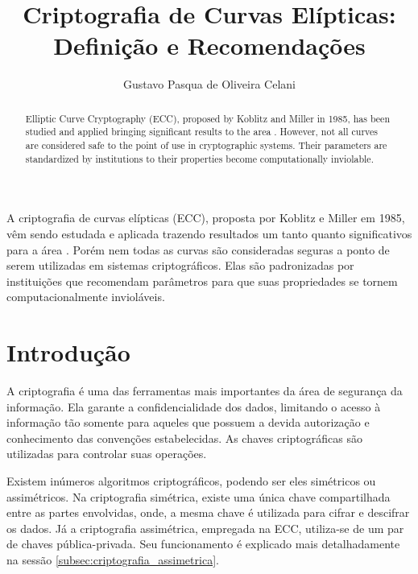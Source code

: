 \documentclass[12pt]{article}
\begin{document}
    \title{
        Criptografia de Curvas Elípticas: Definição e Recomendações
    }
    
    \author{Gustavo Pasqua de Oliveira Celani}

    \address{
        Universidade Estadual de Campinas (UNICAMP)\\Campinas - SP, Brasil\\2019
    }

    \maketitle

    \begin{abstract}
        Elliptic Curve Cryptography (ECC), proposed by Koblitz and Miller in 1985, has been studied and applied bringing significant results to the area \cite{vanstone2000state}. However, not all curves are considered safe to the point of use in cryptographic systems. Their parameters are standardized by institutions to their properties become computationally inviolable.
    \end{abstract}

    \begin{resumo}
        A criptografia de curvas elípticas (ECC), proposta por Koblitz e Miller em 1985, vêm sendo estudada e aplicada trazendo resultados um tanto quanto significativos para a área \cite{vanstone2000state}. Porém nem todas as curvas são consideradas seguras a ponto de serem utilizadas em sistemas criptográficos. Elas são padronizadas por instituições que recomendam parâmetros para que suas propriedades se tornem computacionalmente invioláveis.
    \end{resumo}
  
    \section{Introdução}
  
        A criptografia é uma das ferramentas mais importantes da área de segurança da informação. Ela garante a confidencialidade dos dados, limitando o acesso à informação tão somente para aqueles que possuem a devida autorização e conhecimento das convenções estabelecidas. As chaves criptográficas são utilizadas para controlar suas operações. 

        Existem inúmeros algoritmos criptográficos, podendo ser eles simétricos ou assimétricos. Na criptografia simétrica, existe uma única chave compartilhada entre as partes envolvidas, onde, a mesma chave é utilizada para cifrar e descifrar os dados. Já a criptografia assimétrica, empregada na ECC, utiliza-se de um par de chaves pública-privada. Seu funcionamento é explicado mais detalhadamente na sessão \ref{subsec:criptografia_assimetrica}.
\end{document}
